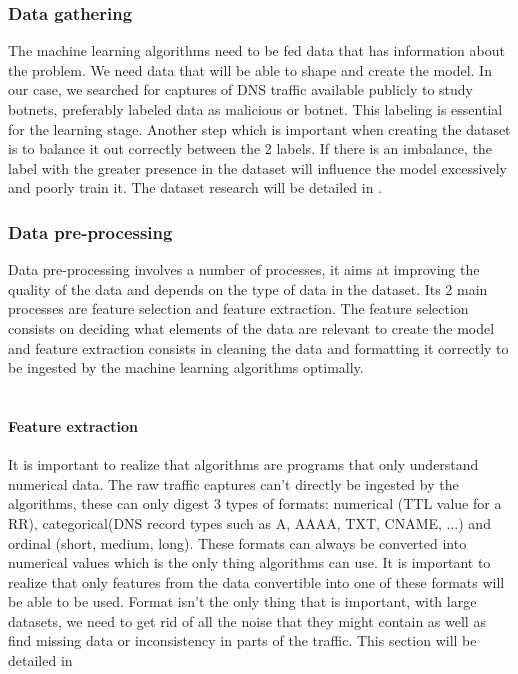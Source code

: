 \subsubsection{Data gathering} The machine learning algorithms need to be fed data that has information about the problem. We need data that will be able to shape and create the model. In our case, we searched for captures of DNS traffic available publicly to study botnets, preferably labeled data as malicious or botnet. This labeling is essential for the learning stage. Another step which is important when creating the dataset is to balance it out correctly between the 2 labels. If there is an imbalance, the label with the greater presence in the dataset will influence the model excessively and poorly train it. The dataset research will be detailed in \label{datasetchapter}.

\subsubsection{Data pre-processing} 
Data pre-processing involves a number of processes, it aims at improving the quality of the data and depends on the type of data in the dataset. Its 2 main processes are feature selection and feature extraction. The feature selection consists on deciding what elements of the data are relevant to create the model and feature extraction consists in cleaning the data and formatting it correctly to be ingested by the machine learning algorithms optimally.\\\\

\paragraph{Feature extraction} It is important to realize that algorithms are programs that only understand numerical data. The raw traffic captures can't directly be ingested by the algorithms, these can only digest 3 types of formats: numerical (TTL value for a RR), categorical(DNS record types such as A, AAAA, TXT, CNAME, ...) and ordinal (short, medium, long). These formats can always be converted into numerical values which is the only thing algorithms can use. It is important to realize that only features from the data convertible into one of these formats will be able to be used. Format isn't the only thing that is important, with large datasets, we need to get rid of all the noise that they might contain as well as find missing data or inconsistency in parts of the traffic.
This section will be detailed in \label{featureextractionlabel}

